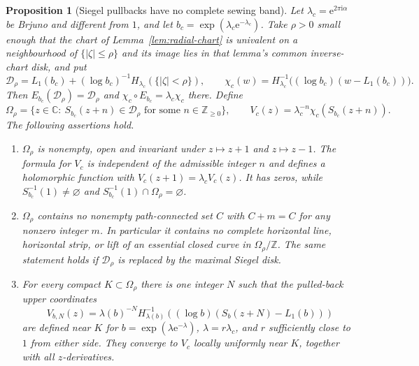\documentclass[11pt]{amsart}
\newtheorem{proposition}[theorem]{Proposition}
\theoremstyle{definition}
\newcommand{\eee}{\mathrm{e}}
\newcommand{\ii}{\mathrm{i}}
\begin{document}
\begin{proposition}[Siegel pullbacks have no complete sewing band]
\label{prop:siegel-pullback}
Let $\lambda_c=\eee^{2\pi\ii\alpha}$ be Brjuno and different from $1$,
and let $b_c=\exp(\lambda_c\eee^{-\lambda_c})$.  Take $\rho>0$ small enough
that the chart of Lemma~\ref{lem:radial-chart} is univalent on a
neighbourhood of $\{|\zeta|\le\rho\}$ and its image lies in that
lemma's common inverse-chart disk, and put
\[
 \mathcal D_\rho=
 L_1(b_c)+(\log b_c)^{-1}H_{\lambda_c}(\{|\zeta|<\rho\}),
 \qquad
 \chi_c(w)=H_{\lambda_c}^{-1}
       \bigl((\log b_c)(w-L_1(b_c))\bigr).
\]
Then $E_{b_c}(\mathcal D_\rho)=\mathcal D_\rho$ and
$\chi_c\circ E_{b_c}=\lambda_c\chi_c$ there.  Define
\[
 \Omega_\rho=
 \bigl\{z\in\mathbb C:\ S_{b_c}(z+n)\in\mathcal D_\rho
                         \text{ for some }n\in\mathbb Z_{\ge0}\bigr\},\qquad
 V_c(z)=\lambda_c^{-n}\chi_c(S_{b_c}(z+n)).
\]
The following assertions hold.
\begin{enumerate}
\item $\Omega_\rho$ is nonempty, open and invariant under $z\mapsto z+1$ and
  $z\mapsto z-1$.  The formula for $V_c$ is independent of the admissible
  integer $n$ and defines a holomorphic function with
  $V_c(z+1)=\lambda_c V_c(z)$.  It has zeros, while
  $S_{b_c}^{-1}(1)\ne\varnothing$ and
  $S_{b_c}^{-1}(1)\cap\Omega_\rho=\varnothing$.
\item $\Omega_\rho$ contains no nonempty path-connected set $C$ with
  $C+m=C$ for any nonzero integer $m$.  In particular it contains no complete horizontal line,
  horizontal strip, or lift of an essential closed curve in
  $\Omega_\rho/\mathbb Z$.  The same statement holds if
  $\mathcal D_\rho$ is replaced by the maximal Siegel disk.
\item For every compact $K\subset\Omega_\rho$ there is one integer $N$
  such that the pulled-back upper coordinates
  \[
   V_{b,N}(z)=\lambda(b)^{-N}
      H_{\lambda(b)}^{-1}\!\left(
        (\log b)(S_b(z+N)-L_1(b))\right)
  \]
  are defined near $K$ for $b=\exp(\lambda\eee^{-\lambda})$,
  $\lambda=r\lambda_c$, and $r$ sufficiently close to $1$ from either
  side.  They converge to $V_c$ locally uniformly near $K$, together
  with all $z$-derivatives.
\end{enumerate}
\end{proposition}
\end{document}

